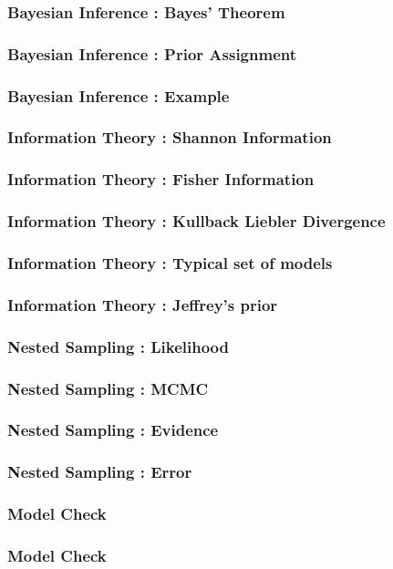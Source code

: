 \documentclass{beamer}
\begin{document}
\begin{frame}
  \frametitle{Bayesian Inference : Bayes' Theorem}

\end{frame}
\begin{frame}
  \frametitle{Bayesian Inference : Prior Assignment}

\end{frame}
\begin{frame}
  \frametitle{Bayesian Inference : Example}

\end{frame}
\begin{frame}
  \frametitle{Information Theory : Shannon Information}

\end{frame}
\begin{frame}
  \frametitle{Information Theory : Fisher Information}

\end{frame}
\begin{frame}
  \frametitle{Information Theory : Kullback Liebler Divergence}

\end{frame}
\begin{frame}
  \frametitle{Information Theory : Typical set of models}

\end{frame}
\begin{frame}
  \frametitle{Information Theory : Jeffrey's prior }

\end{frame}
\begin{frame}
  \frametitle{Nested Sampling : Likelihood}

\end{frame}
\begin{frame}
  \frametitle{Nested Sampling : MCMC}

\end{frame}
\begin{frame}
  \frametitle{Nested Sampling : Evidence}

\end{frame}
\begin{frame}
  \frametitle{Nested Sampling : Error}

\end{frame}
\begin{frame}
  \frametitle{Model Check}

\end{frame}
\begin{frame}
  \frametitle{Model Check}

\end{frame}
\end{document}
